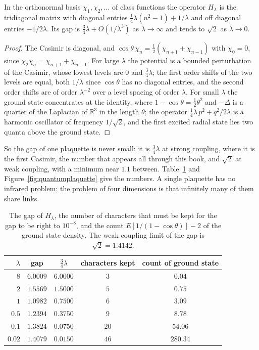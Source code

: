 \begin{proposition}\label{prop:oneplaquette}
In the orthonormal basis $\chi_1,\chi_2,\dots$ of class functions the operator $H_\lambda$ is the tridiagonal matrix with diagonal entries $\frac14\lambda(n^2-1)+1/\lambda$ and off diagonal entries $-1/2\lambda$. Its gap is $\frac34\lambda+O(1/\lambda^3)$ as $\lambda\to\infty$ and tends to $\sqrt2$ as $\lambda\to0$.
\end{proposition}

\begin{proof}
The Casimir is diagonal, and $\cos\theta\,\chi_n=\frac12(\chi_{n+1}+\chi_{n-1})$ with $\chi_0=0$, since $\chi_2\chi_n=\chi_{n+1}+\chi_{n-1}$. For large $\lambda$ the potential is a bounded perturbation of the Casimir, whose lowest levels are $0$ and $\frac34\lambda$; the first order shifts of the two levels are equal, both $1/\lambda$ since $\cos\theta$ has no diagonal entries, and the second order shifts are of order $\lambda^{-2}$ over a level spacing of order $\lambda$. For small $\lambda$ the ground state concentrates at the identity, where $1-\cos\theta=\frac12\theta^2$ and $-\Delta$ is a quarter of the Laplacian of $\mathbb R^3$ in the length $\theta$; the operator $\frac14\lambda\,p^2+q^2/2\lambda$ is a harmonic oscillator of frequency $1/\sqrt2$, and the first excited radial state lies two quanta above the ground state.
\end{proof}

So the gap of one plaquette is never small: it is $\frac34\lambda$ at strong coupling, where it is the first Casimir, the number that appears all through this book, and $\sqrt2$ at weak coupling, with a minimum near $1.1$ between. Table~\ref{tab:oneplaquette} and Figure~\ref{fig:quantumplaquette} give the numbers. A single plaquette has no infrared problem; the problem of four dimensions is that infinitely many of them share links.

\begin{table}[t]
\centering\small
\begin{tabular}{rcccc}
\toprule
$\lambda$ & gap & $\frac34\lambda$ & characters kept & count of ground state \\ \midrule
$8$ & $6.0009$ & $6.0000$ & $3$ & $0.04$ \\
$2$ & $1.5569$ & $1.5000$ & $5$ & $0.75$ \\
$1$ & $1.0982$ & $0.7500$ & $6$ & $3.09$ \\
$0.5$ & $1.2394$ & $0.3750$ & $9$ & $8.78$ \\
$0.1$ & $1.3824$ & $0.0750$ & $20$ & $54.06$ \\
$0.02$ & $1.4079$ & $0.0150$ & $46$ & $280.34$ \\
\bottomrule
\end{tabular}
\caption[One plaquette in the Hamiltonian formulation]{The gap of $H_\lambda$, the number of characters that must be kept for the gap to be right to $10^{-8}$, and the count $E[1/(1-\cos\theta)]-2$ of the ground state density. The weak coupling limit of the gap is $\sqrt2=1.4142$.}
\label{tab:oneplaquette}
\end{table}

